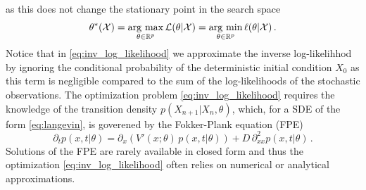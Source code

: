 \documentclass[10pt]{article}
\begin{document}
%
as this does not change the stationary point in the search space
%
\begin{equation}\label{eq:mle}
        \theta^{*}(\mathcal{X}) = \operatorname*{\arg\,max}_{\theta\in \mathbb{R}^{p}}\mathcal{L}(\theta|\mathcal{X}) = \operatorname*{\arg\,min}_{\theta\in \mathbb{R}^{p}}\ell(\theta|\mathcal{X})\,.
\end{equation}
%
Notice that in \eqref{eq:inv_log_likelihood} we approximate the inverse log-likelihhod by ignoring the conditional probability of the deterministic initial condition $X_{0}$ as this term is negligible compared to the sum of the log-likelihoods of the stochastic observations. 
The optimization problem \eqref{eq:inv_log_likelihood} requires the knowledge of the transition density $p(X_{n+1}|X_{n},\theta)$, which, for a SDE of the form \eqref{eq:langevin}, is goverened by the Fokker-Plank equation (FPE)
%
\begin{equation}\label{eq:fpe}
        \partial_{t}p(x,t|\theta) = \partial_{x}(V'(x;\theta)\,p(x,t|\theta)) + D\,\partial_{xx}^{2}p(x,t|\theta)\,.
\end{equation}
%
Solutions of the FPE are rarely available in closed form and thus the optimization \eqref{eq:inv_log_likelihood} often relies on numerical or analytical approximations. 
%
\end{document}
